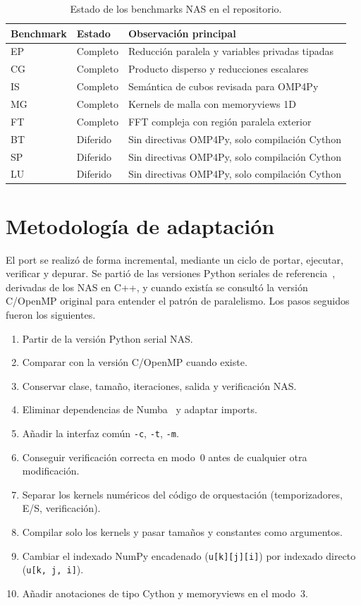 \begin{table}[htbp]
\centering
\begin{tabular}{l|l|l}
Benchmark & Estado & Observación principal \\
\hline
EP & Completo & Reducción paralela y variables privadas tipadas \\
CG & Completo & Producto disperso y reducciones escalares \\
IS & Completo & Semántica de cubos revisada para OMP4Py \\
MG & Completo & Kernels de malla con memoryviews 1D \\
FT & Completo & FFT compleja con región paralela exterior \\
BT & Diferido & Sin directivas OMP4Py, solo compilación Cython \\
SP & Diferido & Sin directivas OMP4Py, solo compilación Cython \\
LU & Diferido & Sin directivas OMP4Py, solo compilación Cython \\
\end{tabular}
\caption{Estado de los benchmarks NAS en el repositorio.}
\label{tab:estado-benchmarks}
\end{table}


\section{Metodología de adaptación}
\label{sec:metodologia-portado}

El port se realizó de forma incremental, mediante un ciclo de portar, ejecutar,
verificar y depurar. Se partió de las versiones Python seriales de
referencia~\cite{NPBPython}, derivadas de los NAS en C++, y cuando existía se
consultó la versión C/OpenMP
original para entender el patrón de paralelismo. Los pasos seguidos fueron los
siguientes.

\begin{enumerate}
  \item Partir de la versión Python serial NAS.
  \item Comparar con la versión C/OpenMP cuando existe.
  \item Conservar clase, tamaño, iteraciones, salida y verificación NAS.
  \item Eliminar dependencias de Numba~\cite{Numba2015} y adaptar imports.
  \item Añadir la interfaz común \texttt{-c}, \texttt{-t}, \texttt{-m}.
  \item Conseguir verificación correcta en modo~0 antes de cualquier otra
        modificación.
  \item Separar los kernels numéricos del código de orquestación (temporizadores,
        E/S, verificación).
  \item Compilar solo los kernels y pasar tamaños y constantes como argumentos.
  \item Cambiar el indexado NumPy encadenado (\texttt{u[k][j][i]}) por indexado
        directo (\texttt{u[k, j, i]}).
  \item Añadir anotaciones de tipo Cython y memoryviews en el modo~3.
\end{enumerate}

